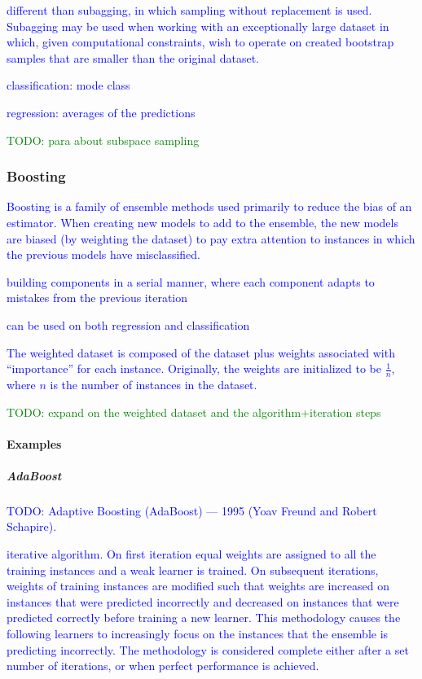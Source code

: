 \textcolor{blue}{different than subagging, in which {sampling without replacement} is used. Subagging may be used when working with an exceptionally large dataset in which, given computational constraints, wish to operate on created bootstrap samples that are smaller than the original dataset.}

\textcolor{blue}{classification: mode class}

\textcolor{blue}{regression: averages of the predictions}

\textcolor{green}{TODO: para about {subspace sampling}}

\subsubsection{Boosting}

\textcolor{blue}{Boosting is a family of ensemble methods used primarily to reduce the bias of an estimator. When creating new models to add to the ensemble, the new models are biased (by weighting the dataset) to pay extra attention to instances in which the previous models have misclassified.}

\textcolor{blue}{building components in a serial manner, where each component adapts to mistakes from the previous iteration}

\textcolor{blue}{can be used on both regression and classification}

\textcolor{blue}{The weighted dataset is composed of the dataset plus weights associated with ``importance'' for each instance. Originally, the weights are initialized to be $\frac{1}{n}$, where $n$ is the number of instances in the dataset.}



\textcolor{green}{TODO: expand on the weighted dataset and the algorithm+iteration steps}

\paragraph{Examples}

\subparagraph{AdaBoost}

\textcolor{blue}{TODO: Adaptive Boosting (AdaBoost) --- 1995 (Yoav Freund and Robert Schapire).}

\textcolor{blue}{iterative algorithm. On first iteration equal weights are assigned to all the training instances and a weak learner is trained. On subsequent iterations, weights of training instances are modified such that weights are increased on instances that were predicted incorrectly and decreased on instances that were predicted correctly before training a new learner. This methodology causes the following learners to increasingly focus on the instances that the ensemble is predicting incorrectly. The methodology is considered complete either after a set number of iterations, or when perfect performance is achieved.}


